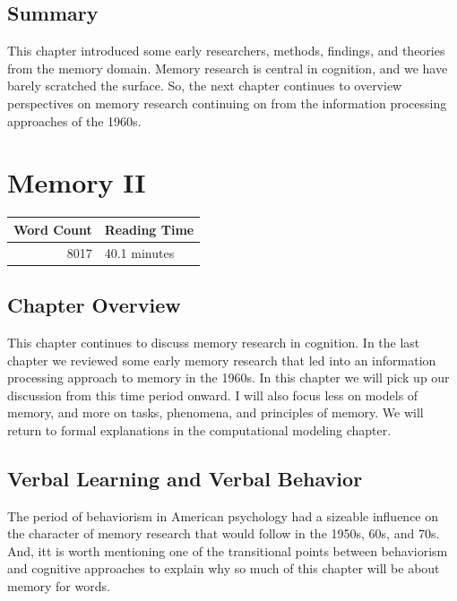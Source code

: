 \documentclass[
  oneside,
  12pt]{crumpbook}
\begin{document}
\hypertarget{summary-2}{%
\section{Summary}\label{summary-2}}

This chapter introduced some early researchers, methods, findings, and theories from the memory domain. Memory research is central in cognition, and we have barely scratched the surface. So, the next chapter continues to overview perspectives on memory research continuing on from the information processing approaches of the 1960s.

\hypertarget{memory-ii}{%
\chapter{Memory II}\label{memory-ii}}

\begin{tabular}{r|l}
\hline
Word Count & Reading Time\\
\hline
8017 & 40.1 minutes\\
\hline
\end{tabular}

\hypertarget{chapter-overview-6}{%
\section{Chapter Overview}\label{chapter-overview-6}}

This chapter continues to discuss memory research in cognition. In the last chapter we reviewed some early memory research that led into an information processing approach to memory in the 1960s. In this chapter we will pick up our discussion from this time period onward. I will also focus less on models of memory, and more on tasks, phenomena, and principles of memory. We will return to formal explanations in the computational modeling chapter.

\hypertarget{verbal-learning-and-verbal-behavior}{%
\section{Verbal Learning and Verbal Behavior}\label{verbal-learning-and-verbal-behavior}}

The period of behaviorism in American psychology had a sizeable influence on the character of memory research that would follow in the 1950s, 60s, and 70s. And, itt is worth mentioning one of the transitional points between behaviorism and cognitive approaches to explain why so much of this chapter will be about memory for words.
\end{document}
